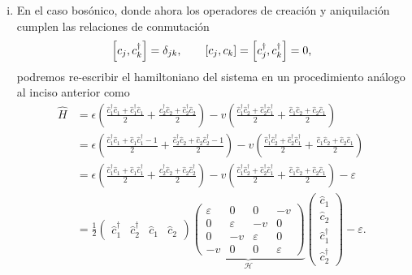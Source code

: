 \documentclass{scrartcl}
\newcommand{\inv}[1]{\frac{1}{#1}}
\renewcommand{\c}{\hat{c}}
\DeclareRobustCommand{\[}{\begin{equation}}
\DeclareRobustCommand{\]}{\end{equation}}
\begin{document}
\begin{enumerate}
\begin{enumerate}
\begin{enumerate}[(i)]
            
            \item En el caso bosónico, donde ahora los operadores de creación y aniquilación cumplen las relaciones de conmutación
            \[ \comm{c_j}{c_k^\dagger} = \delta_{jk}, \quad\quad \comm{c_j}{c_k} = \comm{c_j^\dagger}{c_k^\dagger} = 0, \]
            podremos re-escribir el hamiltoniano del sistema en un procedimiento análogo al inciso anterior como
            \begin{align}
                \hat H &= \epsilon \left( \frac{\c_1^\dagger \c_1 + \c_1^\dagger \c_1}{2} + \frac{\c_2^\dagger \c_2 + \c_2^\dagger \c_2}{2} \right) - v \left( \frac{\c_1^\dagger \c_2^\dagger + \c_2^\dagger \c_1^\dagger}{2} + \frac{\c_1 \c_2 + \c_2 \c_1}{2} \right) \\
                    &= \epsilon \left( \frac{\c_1^\dagger \c_1 + \c_1 \c_1^\dagger - 1}{2} + \frac{\c_2^\dagger \c_2 + \c_2 \c_2^\dagger - 1}{2} \right) - v \left( \frac{\c_1^\dagger \c_2^\dagger + \c_2^\dagger \c_1^\dagger}{2} + \frac{\c_1 \c_2 + \c_2 \c_1}{2} \right) \\
                    &= \epsilon \left( \frac{\c_1^\dagger \c_1 + \c_1 \c_1^\dagger}{2} + \frac{\c_2^\dagger \c_2 + \c_2 \c_2^\dagger}{2} \right) - v \left( \frac{\c_1^\dagger \c_2^\dagger + \c_2^\dagger \c_1^\dagger}{2} + \frac{\c_1 \c_2 + \c_2 \c_1}{2} \right) - \varepsilon \\
                    &= \inv{2} \begin{pmatrix} \c_1^\dagger & \c_2^\dagger & \c_1 & \c_2 \end{pmatrix} \underbrace{\begin{pmatrix} \varepsilon & 0 & 0 & -v \\ 0 & \varepsilon & -v & 0 \\ 0 & -v & \varepsilon & 0 \\ -v & 0 & 0 & \varepsilon \end{pmatrix}}_{\mathcal{H}} \begin{pmatrix} \c_1 \\ \c_2 \\ \c_1^\dagger \\ \c_2^\dagger \end{pmatrix} - \varepsilon.
            \end{align}
            

\end{enumerate}
\end{enumerate}
\end{enumerate}
\end{document}
